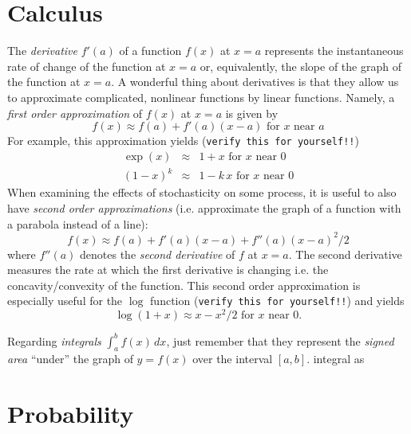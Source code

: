 \section*{Calculus}

The \emph{derivative} $f'(a)$ of a function $f(x)$ at $x=a$ represents
the instantaneous rate of change of the function at $x=a$ or,
equivalently, the slope of the graph of the function at $x=a$. A
wonderful thing about derivatives is that they allow us to approximate
complicated, nonlinear functions by linear functions. Namely, a
\emph{first order approximation} of $f(x)$ at $x=a$ is given by 
\[
f(x) \approx f(a)+f'(a)(x-a) \mbox{ for $x$ near $a$}
\]
For example, this approximation yields (\texttt{verify this for yourself!!}) 
\begin{eqnarray*}
\exp(x)&\approx &1+x \mbox{ for $x$ near $0$}\\
(1-x)^k &\approx & 1-k\,x \mbox{ for $x$ near $0$}
\end{eqnarray*}
When examining the effects of stochasticity on some process, it is useful to also have  \emph{second order approximations} (i.e. approximate the graph of a function with a parabola instead of a line): 
\[
f(x)\approx f(a)+f'(a)(x-a)+f''(a)(x-a)^2/2
\]
where $f''(a)$ denotes the  \emph{second derivative} of $f$ at $x=a$. The second derivative measures the rate at which the first derivative is changing i.e. the concavity/convexity of the function. This second order approximation is especially useful for the $\log$ function (\texttt{verify this for yourself!!}) and yields
\[
\log(1+x)\approx x-x^2/2 \mbox{ for $x$ near $0$}.
\]

Regarding  \emph{integrals} $\int_a^b f(x)\,dx$, just remember that
they represent the \emph{signed area} ``under'' the graph of $y=f(x)$
over the interval $[a,b]$. %
integral as 


\section*{Probability}

